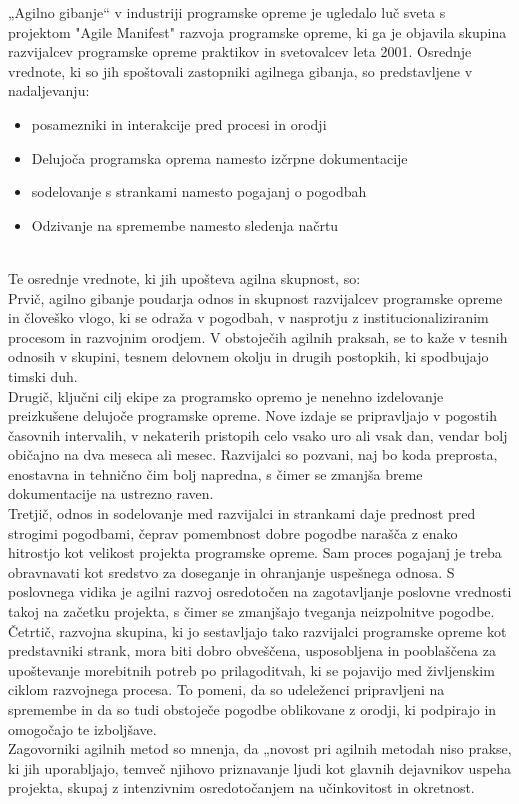 \documentclass[a4paper,12pt,openright]{book}
\begin{document}
„Agilno gibanje“ v industriji programske opreme je ugledalo luč sveta s projektom "Agile Manifest" razvoja programske opreme, ki ga je objavila skupina razvijalcev programske opreme praktikov in svetovalcev leta 2001. Osrednje vrednote, ki so jih spoštovali zastopniki agilnega gibanja, so predstavljene v nadaljevanju:
\begin{itemize}
    \item posamezniki in interakcije pred procesi in orodji
    \item Delujoča programska oprema namesto izčrpne dokumentacije
    \item sodelovanje s strankami namesto pogajanj o pogodbah
    \item Odzivanje na spremembe namesto sledenja načrtu
\end{itemize} \cite{highsmith2009agile} \\
Te osrednje vrednote, ki jih upošteva agilna skupnost, so:\\
Prvič, agilno gibanje poudarja odnos in skupnost
razvijalcev programske opreme in človeško vlogo, ki se odraža v pogodbah, v nasprotju z institucionaliziranim procesom in razvojnim orodjem. V obstoječih agilnih praksah, se to kaže v tesnih odnosih v skupini, tesnem delovnem okolju
in drugih postopkih, ki spodbujajo timski duh. \\
Drugič, ključni cilj ekipe za programsko opremo je nenehno izdelovanje preizkušene delujoče programske opreme. Nove izdaje se pripravljajo v pogostih časovnih intervalih, v nekaterih pristopih celo vsako uro ali vsak dan, vendar bolj običajno na dva meseca ali mesec. 
Razvijalci so pozvani, naj bo koda preprosta, enostavna in tehnično
čim bolj napredna, s čimer se zmanjša breme dokumentacije na ustrezno raven. \\
Tretjič, odnos in sodelovanje med razvijalci in strankami daje prednost pred strogimi pogodbami, čeprav pomembnost dobre pogodbe narašča z enako hitrostjo kot velikost projekta programske opreme.
Sam proces pogajanj je treba obravnavati kot sredstvo za doseganje in
ohranjanje uspešnega odnosa. S poslovnega vidika je agilni razvoj osredotočen na zagotavljanje poslovne vrednosti takoj na začetku projekta, s čimer se zmanjšajo tveganja neizpolnitve pogodbe. \\
Četrtič, razvojna skupina, ki jo sestavljajo tako razvijalci programske opreme kot predstavniki strank, mora biti dobro obveščena, usposobljena in pooblaščena za upoštevanje morebitnih potreb po prilagoditvah, ki se pojavijo med življenskim ciklom razvojnega procesa. To pomeni, da so udeleženci pripravljeni na spremembe in da so tudi obstoječe pogodbe oblikovane z orodji, ki podpirajo in omogočajo te
izboljšave. \\
Zagovorniki agilnih metod so mnenja, da „novost pri agilnih metodah niso prakse, ki jih uporabljajo, temveč njihovo priznavanje ljudi kot glavnih dejavnikov uspeha projekta, skupaj z intenzivnim osredotočanjem na učinkovitost in okretnost. 
\cite{DBLP:journals/corr/abs-1709-08439}
\end{document}
